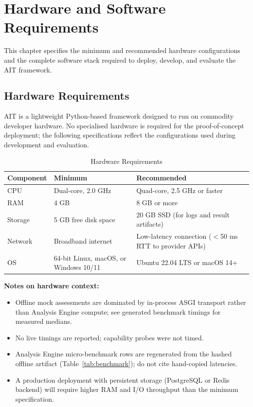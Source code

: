 \documentclass[12pt,a4paper]{report}
\begin{document}
\chapter{Hardware and Software Requirements}
\label{ch:hwsw}

This chapter specifies the minimum and recommended hardware configurations and the complete
software stack required to deploy, develop, and evaluate the AIT framework.

\section{Hardware Requirements}

AIT is a lightweight Python-based framework designed to run on commodity developer hardware.
No specialised hardware is required for the proof-of-concept deployment; the following
specifications reflect the configurations used during development and evaluation.

\begin{table}[H]
    \centering
    \caption{Hardware Requirements}
    \label{tab:hardware}
    \begin{tabularx}{\textwidth}{lXX}
        \toprule
        \textbf{Component} & \textbf{Minimum} & \textbf{Recommended} \\
        \midrule
        CPU       & Dual-core, 2.0 GHz      & Quad-core, 2.5 GHz or faster         \\[4pt]
        RAM       & 4 GB                    & 8 GB or more                          \\[4pt]
        Storage   & 5 GB free disk space    & 20 GB SSD (for logs and result artifacts) \\[4pt]
        Network   & Broadband internet      & Low-latency connection ($<$50 ms RTT to provider APIs) \\[4pt]
        OS        & 64-bit Linux, macOS, or Windows 10/11 & Ubuntu 22.04 LTS or macOS 14+ \\
        \bottomrule
    \end{tabularx}
\end{table}

\textbf{Notes on hardware context:}

\begin{itemize}
    \item Offline mock assessments are dominated by in-process ASGI transport rather than Analysis Engine compute; see generated benchmark timings for measured medians.
    \item No live timings are reported; capability probes were not timed.
    \item Analysis Engine micro-benchmark rows are regenerated from the hashed offline artifact (Table~\ref{tab:benchmark}); do not cite hand-copied latencies.
    \item A production deployment with persistent storage (PostgreSQL or Redis backend) will require higher RAM and I/O throughput than the minimum specification.
\end{itemize}
\end{document}
